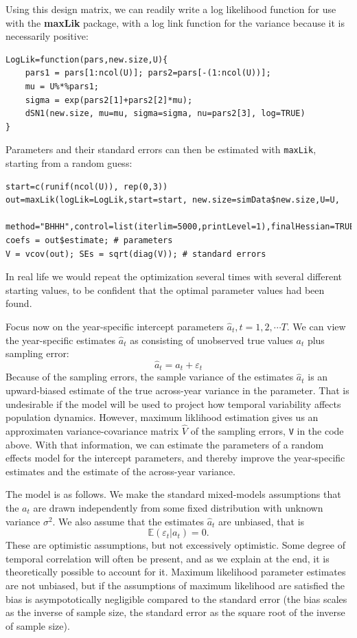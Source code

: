 \documentclass[12pt]{article}
\newcommand{\be}{\begin{equation}}
\newcommand{\ee}{\end{equation}}
\begin{document}
Using this design matrix, we can readily write a log likelihood function for use with 
the \textbf{maxLik} package, with a log link function for the variance because it is necessarily positive: 
\begin{lstlisting}
LogLik=function(pars,new.size,U){
    pars1 = pars[1:ncol(U)]; pars2=pars[-(1:ncol(U))];
    mu = U%*%pars1;  
    sigma = exp(pars2[1]+pars2[2]*mu);
    dSN1(new.size, mu=mu, sigma=sigma, nu=pars2[3], log=TRUE)
}
\end{lstlisting} 

Parameters and their standard errors can then be estimated with \texttt{maxLik}, 
starting from a random guess: 
\begin{lstlisting}
start=c(runif(ncol(U)), rep(0,3))
out=maxLik(logLik=LogLik,start=start, new.size=simData$new.size,U=U,
  method="BHHH",control=list(iterlim=5000,printLevel=1),finalHessian=TRUE);
coefs = out$estimate; # parameters
V = vcov(out); SEs = sqrt(diag(V));	# standard errors 
\end{lstlisting}  
In real life we would repeat the optimization several times with several different starting values, to be confident that
the optimal parameter values had been found. 

Focus now on the year-specific intercept parameters $\hat{a}_t, t = 1,2,\cdots T$. 
We can view the year-specific estimates $\hat{a}_t$ as consisting of unobserved true values $a_t$ plus sampling error:
\be
\hat{a}_t= a_t + \varepsilon_t 
\ee
Because of the sampling errors, the sample variance of
the estimates $\hat{a}_t$ is an upward-biased estimate of the true across-year variance in the parameter. 
That is undesirable if the model will be used to project how temporal variability affects population dynamics. 
However, maximum liklihood estimation gives us an approximaten variance-covariance matrix $\hat{V}$ of the
sampling errors, \texttt{V} in the code above. With that information, we can estimate the parameters
of a random effects model for the intercept parameters, and thereby improve the year-specific estimates and
the estimate of the across-year variance.  

The model is as follows. We make the standard mixed-models assumptions that the $a_t$ are drawn 
independently from some fixed distribution with unknown variance $\sigma^2$. We also assume that the estimates 
$\hat{a}_t$ are unbiased, that is
\be
\mathbb{E}(\varepsilon_t \vert a_t) = 0.    
\ee
These are optimistic assumptions, but not excessively optimistic. Some degree of temporal correlation will often be
present, and as we explain at the end, it is theoretically possible to account for it. 
Maximum likelihood parameter estimates are not unbiased, but if the assumptions
of maximum likelihood are satisfied the bias is asympototically negligible compared to the standard error (the 
bias scales as the inverse of sample size, the standard error as the square root of the inverse of sample size).  
\end{document}
